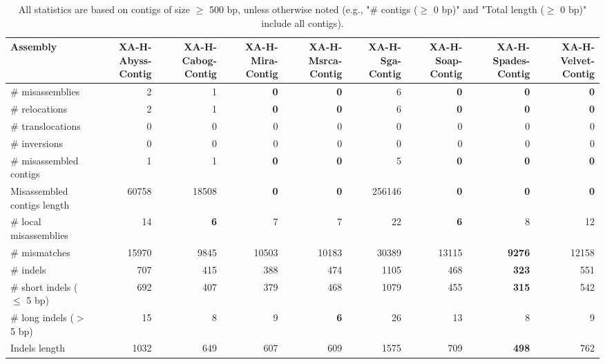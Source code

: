 \documentclass[12pt,a4paper]{article}
\begin{document}
\begin{table}[ht]
\begin{center}
\caption{All statistics are based on contigs of size $\geq$ 500 bp, unless otherwise noted (e.g., "\# contigs ($\geq$ 0 bp)" and "Total length ($\geq$ 0 bp)" include all contigs).}
\begin{tabular}{|l*{8}{|r}|}
\hline
Assembly & XA-H-Abyss-Contig & XA-H-Cabog-Contig & XA-H-Mira-Contig & XA-H-Msrca-Contig & XA-H-Sga-Contig & XA-H-Soap-Contig & XA-H-Spades-Contig & XA-H-Velvet-Contig \\ \hline
\# misassemblies & 2 & 1 & {\bf 0} & {\bf 0} & 6 & {\bf 0} & {\bf 0} & {\bf 0} \\ \hline
\hspace{5mm}\# relocations & 2 & 1 & {\bf 0} & {\bf 0} & 6 & {\bf 0} & {\bf 0} & {\bf 0} \\ \hline
\hspace{5mm}\# translocations & 0 & 0 & 0 & 0 & 0 & 0 & 0 & 0 \\ \hline
\hspace{5mm}\# inversions & 0 & 0 & 0 & 0 & 0 & 0 & 0 & 0 \\ \hline
\# misassembled contigs & 1 & 1 & {\bf 0} & {\bf 0} & 5 & {\bf 0} & {\bf 0} & {\bf 0} \\ \hline
Misassembled contigs length & 60758 & 18508 & {\bf 0} & {\bf 0} & 256146 & {\bf 0} & {\bf 0} & {\bf 0} \\ \hline
\# local misassemblies & 14 & {\bf 6} & 7 & 7 & 22 & {\bf 6} & 8 & 12 \\ \hline
\# mismatches & 15970 & 9845 & 10503 & 10183 & 30389 & 13115 & {\bf 9276} & 12158 \\ \hline
\# indels & 707 & 415 & 388 & 474 & 1105 & 468 & {\bf 323} & 551 \\ \hline
\hspace{5mm}\# short indels ($\leq$ 5 bp) & 692 & 407 & 379 & 468 & 1079 & 455 & {\bf 315} & 542 \\ \hline
\hspace{5mm}\# long indels ($>$ 5 bp) & 15 & 8 & 9 & {\bf 6} & 26 & 13 & 8 & 9 \\ \hline
Indels length & 1032 & 649 & 607 & 609 & 1575 & 709 & {\bf 498} & 762 \\ \hline
\end{tabular}
\end{center}
\end{table}
\end{document}
